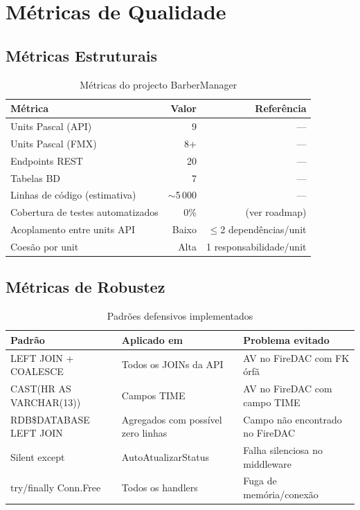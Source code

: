 \documentclass[12pt,a4paper]{article}
\begin{document}
\newpage
\section{Métricas de Qualidade}

\subsection{Métricas Estruturais}

\begin{table}[H]
\centering
\caption{Métricas do projecto BarberManager}
\begin{tabular}{@{}lrr@{}}
\toprule
\textbf{Métrica} & \textbf{Valor} & \textbf{Referência} \\
\midrule
Units Pascal (API) & 9 & — \\
Units Pascal (FMX) & 8+ & — \\
Endpoints REST & 20 & — \\
Tabelas BD & 7 & — \\
Linhas de código (estimativa) & $\sim$5\,000 & — \\
Cobertura de testes automatizados & 0\% & (ver roadmap) \\
Acoplamento entre units API & Baixo & $\leq$2 dependências/unit \\
Coesão por unit & Alta & 1 responsabilidade/unit \\
\bottomrule
\end{tabular}
\end{table}

\subsection{Métricas de Robustez}

\begin{table}[H]
\centering
\caption{Padrões defensivos implementados}
\begin{tabular}{@{}lll@{}}
\toprule
\textbf{Padrão} & \textbf{Aplicado em} & \textbf{Problema evitado} \\
\midrule
LEFT JOIN + COALESCE & Todos os JOINs da API & AV no FireDAC com FK órfã \\
CAST(HR AS VARCHAR(13)) & Campos TIME & AV no FireDAC com campo TIME \\
RDB\$DATABASE LEFT JOIN & Agregados com possível zero linhas & Campo não encontrado no FireDAC \\
Silent except & AutoAtualizarStatus & Falha silenciosa no middleware \\
try/finally Conn.Free & Todos os handlers & Fuga de memória/conexão \\
\bottomrule
\end{tabular}
\end{table}
\end{document}
